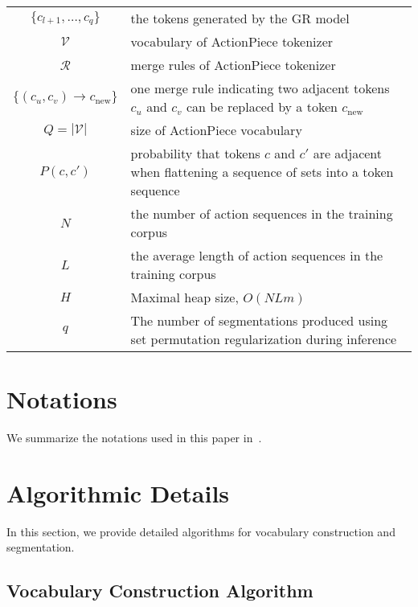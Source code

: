\begin{table*}[!t]
{\begin{tabular}{cl}
		$\{c_{l+1}, \ldots, c_q\}$ & the tokens generated by the GR model \\
		$\mathcal{V}$ & vocabulary of ActionPiece tokenizer \\
		$\mathcal{R}$ & merge rules of ActionPiece tokenizer \\
		$\{(c_u, c_v) \to c_{\text{new}}\}$ & one merge rule indicating two adjacent tokens $c_u$ and $c_v$ can be replaced by a token $c_{\text{new}}$ \\
		$Q = |\mathcal{V}|$ & size of ActionPiece vocabulary \\
		$P(c, c')$ & probability that tokens $c$ and $c'$ are adjacent when flattening a sequence of sets into a token sequence \\
		$N$ & the number of action sequences in the training corpus \\
		$L$ & the average length of action sequences in the training corpus \\
		$H$ & Maximal heap size, $O(NLm)$\\
		$q$ & The number of segmentations produced using set permutation regularization during inference\\
		\bottomrule
	\end{tabular}
	}
\end{table*}

\section{Notations}

We summarize the notations used in this paper in~.


\section{Algorithmic Details}

In this section, we provide detailed algorithms for vocabulary construction and segmentation.

\subsection{Vocabulary Construction Algorithm}


